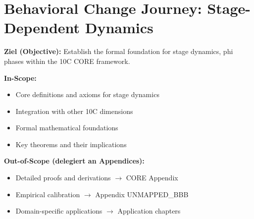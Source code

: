 %
%
%
%

\chapter{Behavioral Change Journey: Stage-Dependent Dynamics}
\label{ch:bcj}

\begin{tcolorbox}[
    colback=purple!5!white,
    colframe=purple!75!black,
    title={\textbf{Chapter Scope: Ziel / In-Scope / Out-of-Scope}},
    fonttitle=\bfseries
]

\textbf{Ziel (Objective):}
Establish the formal foundation for stage dynamics, phi phases within the 10C CORE framework.

\vspace{0.3cm}
\textbf{In-Scope:}
\begin{itemize}[nosep]
    \item Core definitions and axioms for stage dynamics
    \item Integration with other 10C dimensions
    \item Formal mathematical foundations
    \item Key theorems and their implications
\end{itemize}

\vspace{0.3cm}
\textbf{Out-of-Scope (delegiert an Appendices):}
\begin{itemize}[nosep]
    \item Detailed proofs and derivations $\rightarrow$ CORE Appendix
    \item Empirical calibration $\rightarrow$ Appendix UNMAPPED_BBB
    \item Domain-specific applications $\rightarrow$ Application chapters
\end{itemize}

\end{tcolorbox}



